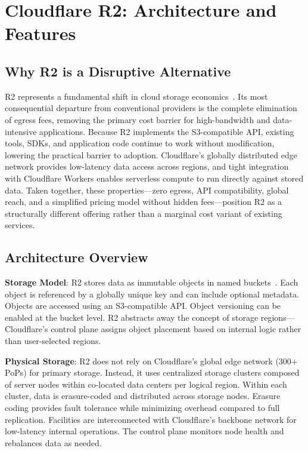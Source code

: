 \section{Cloudflare R2: Architecture and Features}\label{sec:r2}

\subsection{Why R2 is a Disruptive Alternative}

R2 represents a fundamental shift in cloud storage economics~\cite{cloudflare-r2-product,yconsulting-r2-comparison}. Its most consequential departure from conventional providers is the complete elimination of egress fees, removing the primary cost barrier for high-bandwidth and data-intensive applications. Because R2 implements the S3-compatible API, existing tools, SDKs, and application code continue to work without modification, lowering the practical barrier to adoption. Cloudflare's globally distributed edge network provides low-latency data access across regions, and tight integration with Cloudflare Workers enables serverless compute to run directly against stored data. Taken together, these properties---zero egress, API compatibility, global reach, and a simplified pricing model without hidden fees---position R2 as a structurally different offering rather than a marginal cost variant of existing services.

\subsection{Architecture Overview}

\textbf{Storage Model}: R2 stores data as immutable objects in named buckets~\cite{cloudflare-r2-docs}. Each object is referenced by a globally unique key and can include optional metadata. Objects are accessed using an S3-compatible API. Object versioning can be enabled at the bucket level. R2 abstracts away the concept of storage regions—Cloudflare's control plane assigns object placement based on internal logic rather than user-selected regions.

\textbf{Physical Storage}: R2 does not rely on Cloudflare's global edge network (300+ PoPs) for primary storage. Instead, it uses centralized storage clusters composed of server nodes within co-located data centers per logical region. Within each cluster, data is erasure-coded and distributed across storage nodes. Erasure coding provides fault tolerance while minimizing overhead compared to full replication. Facilities are interconnected with Cloudflare's backbone network for low-latency internal operations. The control plane monitors node health and rebalances data as needed.

